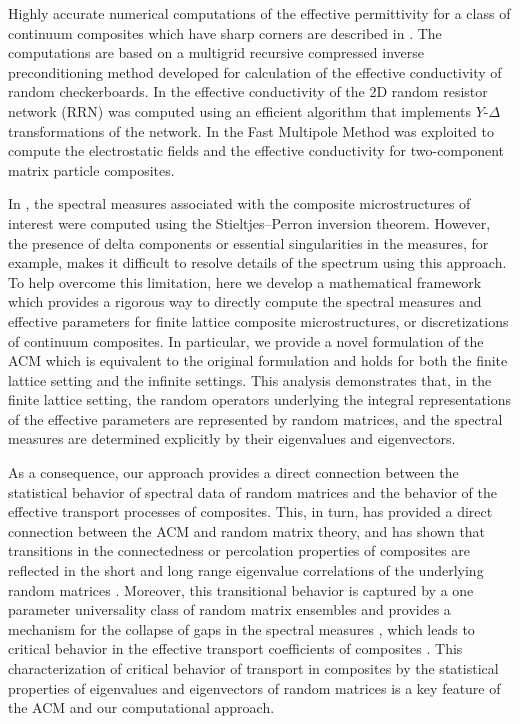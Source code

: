 \documentclass{cmslatex}
\begin{document}
Highly accurate numerical computations of the effective permittivity
for a class of continuum composites which have sharp corners are
described in \cite{Helsing:NJP:115005}. The computations are based on
a multigrid recursive compressed inverse preconditioning method
\cite{Helsing:2008:8820,Helsing:JCP:1171,Helsing:JCP:7533} developed 
for calculation of the effective conductivity of random
checkerboards. In \cite{Day:JPCM-96} the effective 
conductivity of the 2D random resistor network (RRN) 
was computed using an efficient algorithm that implements $Y$-$\Delta$
transformations of the network. In
\cite{Greengard:1994:379,Cheng:1997:629,Greengard:2006:64} the Fast
Multipole Method was exploited to compute the electrostatic fields and
the effective conductivity for two-component matrix particle
composites.      


In \cite{Helsing:NJP:115005,Day:JPCM-96}, the spectral measures
associated with the composite microstructures of interest were
computed using the Stieltjes--Perron inversion theorem. However, the
presence of delta components or essential singularities in the
measures, for example, makes it difficult to resolve details of the
spectrum using this approach. To help overcome this limitation, here
we develop a mathematical framework which provides a rigorous way to
directly compute the spectral measures and effective parameters for
finite lattice composite microstructures, or discretizations of
continuum composites. In particular, we provide a novel
formulation of the ACM which is equivalent to
the original formulation \cite{Golden:CMP-473,Bruno:PRSLA-353} and
holds for both the finite lattice setting and the infinite
settings. This analysis demonstrates that, in the finite lattice
setting, the random operators underlying the integral representations
of the effective parameters are represented by random matrices, and
the spectral measures are determined explicitly by their eigenvalues
and eigenvectors.   



As a consequence,
our approach provides a direct connection between the statistical
behavior of spectral data of random matrices and the behavior of the
effective transport processes of composites. This, in turn, has
provided a direct connection between the ACM and random matrix theory,
and has shown that transitions in the connectedness or percolation
properties of composites are reflected in the short and long range
eigenvalue correlations of the underlying random matrices
\cite{Murphy:PHD_Thesis}. Moreover, this transitional behavior
is captured by a one parameter universality class of random matrix
ensembles and provides a mechanism for the collapse of gaps in the
spectral measures \cite{Murphy:PHD_Thesis}, which leads to
critical behavior in the effective transport coefficients of
composites \cite{Murphy:JMP:063506}. This characterization of critical
behavior of transport in composites by the statistical properties of
eigenvalues and eigenvectors of random matrices is a key feature of
the ACM and our computational approach. 
\end{document}
